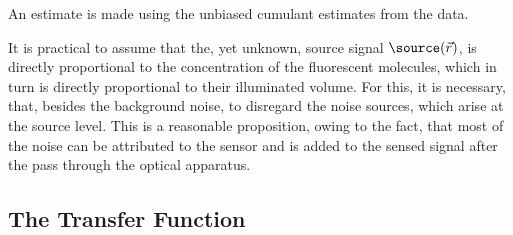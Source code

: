 \begin{marginfigure}
    \caption{%
        The histogram of \(\sensed(\vec{r}) - \hat{\noisefree}(\vec{r})\) for \(\vec{r} \in A\).
        The Poisson component of the histogram is apparent which should in part imply that the Gaussian component does 
            not play a large role in our acquisition (i.e. that \(b \ll a\)).%
        }
\end{marginfigure}%

An estimate is made using the unbiased cumulant estimates from the data.


It is practical to assume that the, yet unknown, source signal \(\source(\vec{r})\), is directly proportional to the
    concentration of the fluorescent molecules, which in turn is directly proportional to their illuminated volume.
For this, it is necessary, that, besides the background noise, to disregard the noise sources, which arise at the source 
    level.
This is a reasonable proposition, owing to the fact, that most of the noise can be attributed to the sensor and is added
    to the sensed signal after the pass through the optical apparatus.

\subsection{The Transfer Function}%

